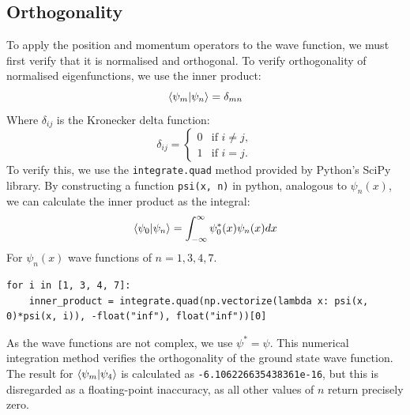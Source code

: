 \documentclass[a4paper]{article}
\begin{document}
\subsection{Orthogonality}
To apply the position and momentum operators to the wave function, we must first verify that it is normalised and orthogonal. To verify orthogonality of normalised eigenfunctions, we use the inner product:
\begin{equation}
\bra{\psi_m} \ket{\psi_n} = \delta_{mn}
\end{equation}
Where $\delta_{ij}$ is the Kronecker delta function:
\begin{equation}
{\displaystyle \delta _{ij}={\begin{cases}0&{\text{if }}i\neq j,\\1&{\text{if }}i=j.\end{cases}}}
\end{equation}
To verify this, we use the \lstinline$integrate.quad$ method provided by Python's SciPy library. By constructing a function \lstinline$psi(x, n)$ in python, analogous to $\psi_n(x)$, we can calculate the inner product as the integral:
\begin{equation}
\bra{\psi_0} \ket{\psi_n}=\int^\infty_{-\infty}\psi_0^*(x)\psi_n(x)dx
\end{equation}
For $\psi_n(x)$ wave functions of $n=1, 3, 4, 7$.
\begin{lstlisting}
for i in [1, 3, 4, 7]:
    inner_product = integrate.quad(np.vectorize(lambda x: psi(x, 0)*psi(x, i)), -float("inf"), float("inf"))[0]
\end{lstlisting} As the wave functions are not complex, we use $\psi^*=\psi$. This numerical integration method verifies the orthogonality of the ground state wave function. The result for $\bra{\psi_m} \ket{\psi_4}$ is calculated as \lstinline$-6.106226635438361e-16$, but this is disregarded as a floating-point inaccuracy, as all other values of $n$ return precisely zero.
\end{document}
